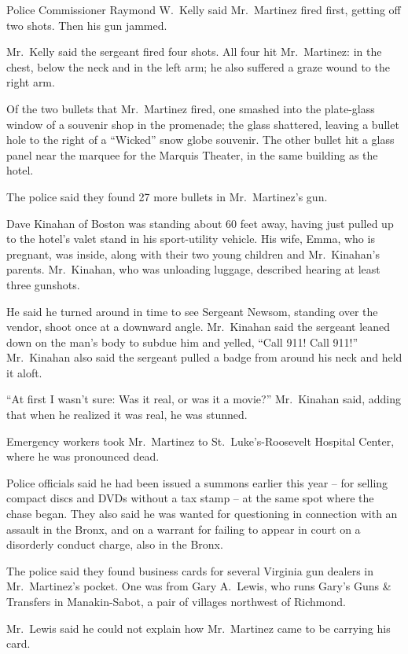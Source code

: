 ﻿\documentclass[12pt]{article}
\begin{document}
Police Commissioner Raymond W.~Kelly said Mr.~Martinez fired first, getting off two shots. Then his
gun jammed.

Mr.~Kelly said the sergeant fired four shots. All four hit Mr.~Martinez: in the chest, below the
neck and in the left arm; he also suffered a graze wound to the right arm.

Of the two bullets that Mr.~Martinez fired, one smashed into the plate-glass window of a souvenir
shop in the promenade; the glass shattered, leaving a bullet hole to the right of a ``Wicked'' snow
globe souvenir. The other bullet hit a glass panel near the marquee for the Marquis Theater, in the
same building as the hotel.

The police said they found 27 more bullets in Mr.~Martinez's gun.

Dave Kinahan of Boston was standing about 60 feet away, having just pulled up to the hotel's valet
stand in his sport-utility vehicle. His wife, Emma, who is pregnant, was inside, along with their
two young children and Mr.~Kinahan's parents. Mr.~Kinahan, who was unloading luggage, described
hearing at least three gunshots.

He said he turned around in time to see Sergeant Newsom, standing over the vendor, shoot once at a
downward angle. Mr.~Kinahan said the sergeant leaned down on the man's body to subdue him and
yelled, ``Call 911! Call 911!'' Mr.~Kinahan also said the sergeant pulled a badge from around his
neck and held it aloft.

``At first I wasn't sure: Was it real, or was it a movie?'' Mr.~Kinahan said, adding that when he
realized it was real, he was stunned.

Emergency workers took Mr.~Martinez to St.~Luke's-Roosevelt Hospital Center, where he was pronounced
dead.

Police officials said he had been issued a summons earlier this year -- for selling compact discs
and DVDs without a tax stamp -- at the same spot where the chase began. They also said he was wanted
for questioning in connection with an assault in the Bronx, and on a warrant for failing to appear
in court on a disorderly conduct charge, also in the Bronx.

The police said they found business cards for several Virginia gun dealers in Mr.~Martinez's pocket.
One was from Gary A.~Lewis, who runs Gary's Guns \& Transfers in Manakin-Sabot, a pair of villages
northwest of Richmond.

Mr.~Lewis said he could not explain how Mr.~Martinez came to be carrying his card.
\end{document}
